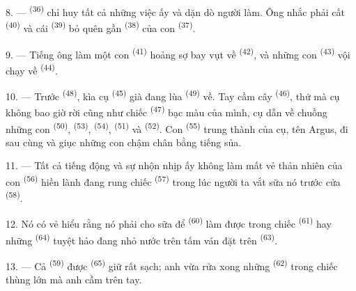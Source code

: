 \VUsaut{3.0mm}
\VUsaut{3.0mm}

8. ---  \textsuperscript{(36)} chỉ huy tất cả những việc ấy và
dặn dò người làm. Ông nhắc phải cất  \textsuperscript{(40)} và cái
 \textsuperscript{(39)} bỏ quên gần 
\textsuperscript{(38)} của con  \textsuperscript{(37)}.

9. --- Tiếng ông làm một con  \textsuperscript{(41)} hoảng sợ bay vụt về
 \textsuperscript{(42)}, và những con 
\textsuperscript{(43)} vội chạy về  \textsuperscript{(44)}.

10. --- Trước  \textsuperscript{(48)}, kìa cụ 
\textsuperscript{(45)} già đang lùa  \textsuperscript{(49)} về. Tay cầm cây
 \textsuperscript{(46)}, thứ mà cụ không bao giờ rời cũng như chiếc
 \textsuperscript{(47)} bạc màu của mình, cụ dẫn về chuồng những con
 \textsuperscript{(50)},  \textsuperscript{(53)},
 \textsuperscript{(54)},  \textsuperscript{(51)} và
 \textsuperscript{(52)}. Con  \textsuperscript{(55)} trung
thành của cụ, tên Argus, đi sau cùng và giục những con chậm chân bằng tiếng sủa.

11. --- Tất cả tiếng động và sự nhộn nhịp ấy không làm mất vẻ thản nhiên của con
 \textsuperscript{(56)} hiền lành đang rung chiếc 
\textsuperscript{(57)} trong lúc người ta vắt sữa nó trước cửa 
\textsuperscript{(58)}.

12. Nó có vẻ hiểu rằng nó phải cho sữa để  \textsuperscript{(60)}
làm được  trong chiếc  \textsuperscript{(61)} hay những
 \textsuperscript{(64)} tuyệt hảo đang nhỏ nước trên tấm ván đặt
trên  \textsuperscript{(63)}.

13. --- Cả  \textsuperscript{(59)} được 
\textsuperscript{(65)} giữ rất sạch; anh vừa rửa xong những 
\textsuperscript{(62)} trong chiếc thùng lớn mà anh cầm trên tay.

\VUsaut{3.0mm}
\VUsaut{3.0mm}


